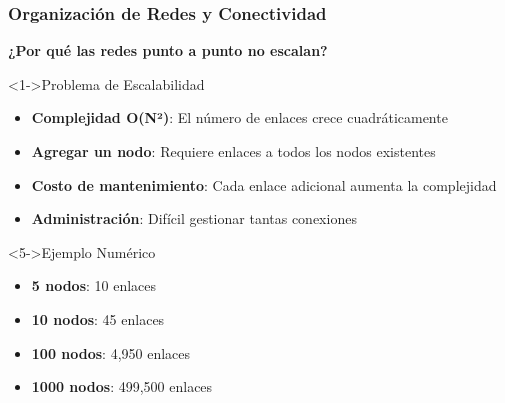 \documentclass[aspectratio=169]{beamer}
\begin{document}
\begin{frame}
\frametitle{Organización de Redes y Conectividad}

\begin{center}
\Large \textbf{¿Por qué las redes punto a punto no escalan?}
\end{center}

\begin{block}<1->{Problema de Escalabilidad}
\begin{itemize}
\item<1-> \textbf{Complejidad O(N²)}: El número de enlaces crece cuadráticamente
\item<2-> \textbf{Agregar un nodo}: Requiere enlaces a todos los nodos existentes
\item<3-> \textbf{Costo de mantenimiento}: Cada enlace adicional aumenta la complejidad
\item<4-> \textbf{Administración}: Difícil gestionar tantas conexiones
\end{itemize}
\end{block}

\begin{block}<5->{Ejemplo Numérico}
\begin{itemize}
\item<5-> \textbf{5 nodos}: 10 enlaces
\item<6-> \textbf{10 nodos}: 45 enlaces  
\item<7-> \textbf{100 nodos}: 4,950 enlaces
\item<8-> \textbf{1000 nodos}: 499,500 enlaces
\end{itemize}
\end{block}
\end{frame}
  
\end{document}
